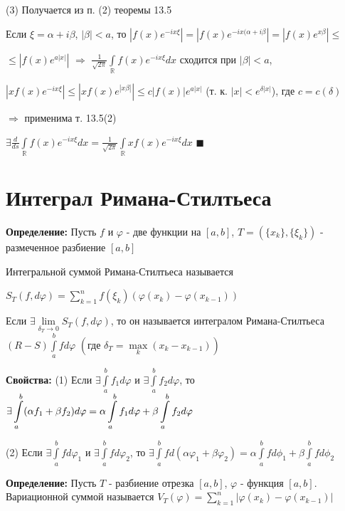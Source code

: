 \documentclass[a4paper]{report}
\newcommand*{\hm}[1]{#1\nobreak\discretionary{}%
            {\hbox{$\mathsurround=0pt #1$}}{}}
\begin{document}
(3) Получается из п. (2) теоремы 13.5

Если $\xi=\alpha+i\beta$, $|\beta|<a$, то $|f(x)e^{-ix\xi}|=|f(x)e^{-ix(\alpha+i\beta}|=|f(x)e^{x\beta}|\le$

\noindent $\le|f(x)e^{a|x|}|$ $\Rightarrow$ $\displaystyle\frac{1}{\sqrt{2\pi}}\displaystyle\int\limits_{\mathbb R}f(x)e^{-ix\xi}dx$ сходится при $|\beta|<a$,

$|xf(x)e^{-ix\xi}|\le|xf(x)e^{|x\beta|}|\le c|f(x)|e^{a|x|}$ (т. к. $|x|<e^{\delta|x|}$), где $c=c(\delta)$

$\Rightarrow$ применима т. 13.5(2)

$\exists\displaystyle\frac{d}{ds}\displaystyle\int\limits_{\mathbb R}f(x)e^{-ix\xi}dx=\frac{1}{\sqrt{2\pi}}\displaystyle\int\limits_{\mathbb R}xf(x)e^{-ix\xi}dx$ $\blacksquare$






\chapter{Интеграл Римана-Стилтьеса}

\noindent\textbf{Определение:} Пусть $f$ и $\varphi$ - две функции на $[a,b]$, $T=\left(\{x_k\},\{\xi_k\}\right)$ - размеченное разбиение $[a,b]$

Интегральной суммой Римана-Стилтьеса называется

$S_T(f,d\varphi)=\sum\limits_{k=1}^n f(\xi_k)\left(\varphi(x_k)-\varphi(x_{k-1})\right)$

Если $\exists\lim\limits_{\delta_T\to0}S_T(f,d\varphi)$, то он называется интегралом Римана-Стилтьеса $(R-S)\displaystyle\int\limits_a^b fd\varphi$ $\left(\text{где }\delta_T=\max\limits_k(x_k-x_{k-1})\right)$
\bigskip

\noindent\textbf{Свойства:} (1) Если $\exists\displaystyle\int\limits_a^bf_1d\varphi$ и $\exists\displaystyle\int\limits_a^b f_2d\varphi$, то $\exists \displaystyle\int\limits_a^b(\alpha f_1+\beta f_2)d\varphi=\alpha\displaystyle\int\limits_a^b f_1d\varphi\hm+\beta\displaystyle\int\limits_a^b f_2d\varphi$

(2) Если $\exists\displaystyle\int\limits_a^b fd\varphi_1$ и $\exists\displaystyle\int\limits_a^b fd\varphi_2$, то $\exists \displaystyle\int\limits_a^b fd(\alpha\varphi_1+\beta\varphi_2)=\alpha\displaystyle\int\limits_a^b fd\phi_1+\beta\displaystyle\int\limits_a^b fd\phi_2$
\bigskip

\noindent\textbf{Определение:} Пусть $T$ - разбиение отрезка $[a,b]$, $\varphi$ - функция $[a,b]$. Вариационной суммой называется $V_T(\varphi)=\sum\limits_{k=1}^n\left|\varphi(x_k)-\varphi(x_{k-1})\right|$
\end{document}
